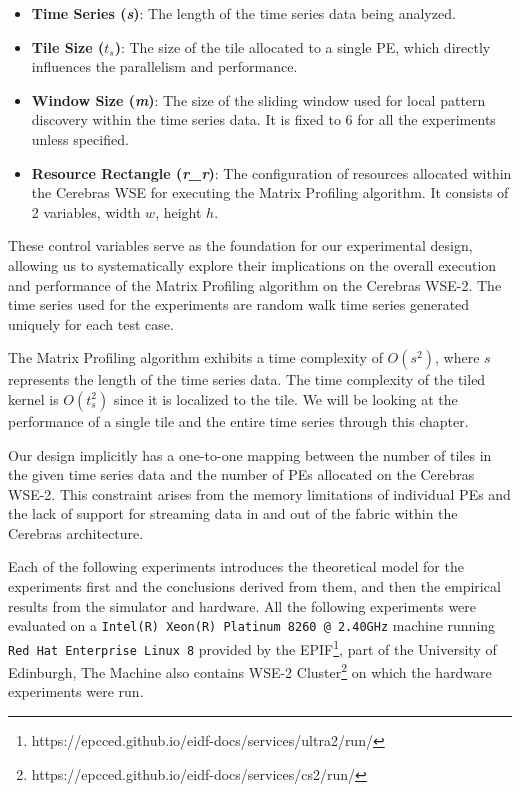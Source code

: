 \begin{itemize}
    \item \textbf{Time Series (\textit{s})}: The length of the time series data being analyzed.
    \item \textbf{Tile Size (\textit{$t_s$})}: The size of the tile allocated to a single PE, which directly influences the parallelism and performance.
    \item \textbf{Window Size (\textit{m})}: The size of the sliding window used for local pattern discovery within the time series data. It is fixed to $6$ for all the experiments unless specified.
    \item \textbf{Resource Rectangle (\textit{r\_r})}: The configuration of resources allocated within the Cerebras WSE for executing the Matrix Profiling algorithm. It consists of 2 variables, width $w$, height $h$.
\end{itemize}

These control variables serve as the foundation for our experimental design, allowing us to systematically explore their implications on the overall execution and performance of the Matrix Profiling algorithm on the Cerebras WSE-2. The time series used for the experiments are random walk time series generated uniquely for each test case.

The Matrix Profiling algorithm exhibits a time complexity of \(O(s^2)\), where \(s\) represents the length of the time series data. The time complexity of the tiled kernel is \(O(t_s^2)\) since it is localized to the tile. We will be looking at the performance of a single tile and the entire time series through this chapter.

Our design implicitly has a one-to-one mapping between the number of tiles in the given time series data and the number of PEs allocated on the Cerebras WSE-2. This constraint arises from the memory limitations of individual PEs and the lack of support for streaming data in and out of the fabric within the Cerebras architecture.

Each of the following experiments introduces the theoretical model for the experiments first and the conclusions derived from them, and then the empirical results from the simulator and hardware. All the following experiments were evaluated on a \texttt{Intel(R) Xeon(R) Platinum 8260 @ 2.40GHz} machine running \texttt{Red Hat Enterprise Linux 8} provided by the EPIF\footnote{https://epcced.github.io/eidf-docs/services/ultra2/run/}, part of the University of Edinburgh, The Machine also contains WSE-2 Cluster\footnote{https://epcced.github.io/eidf-docs/services/cs2/run/} on which the hardware experiments were run.

